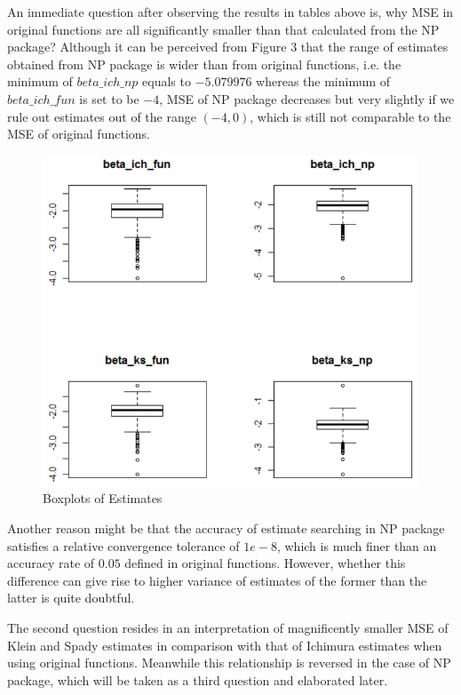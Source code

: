\documentclass[a4paper]{article}
\begin{document}
An immediate question after observing the results in tables above is, why MSE in original functions are all significantly smaller than that calculated from the NP package?
Although it can be perceived from Figure 3 that the range of estimates obtained from NP package is wider than from original functions, i.e. the minimum of $beta\_ich\_np$ equals to $-5.079976$ whereas the minimum of $beta\_ich\_fun$ is set to be $-4$, MSE of NP package decreases but very slightly if we rule out estimates out of the range $(-4,0)$, which is still not comparable to the MSE of original functions. 

\begin{figure}[h!]
  \caption{Boxplots of Estimates}
  \includegraphics[width=\linewidth]{boxplot_beta.png}
 
  \label{fig:boxplots of estimates}
\end{figure}

Another reason might be that the accuracy of estimate searching in NP package satisfies a relative convergence tolerance of $1e-8$, which is much finer than an accuracy rate of $0.05$ defined in original functions. However, whether this difference can give rise to higher variance of estimates of the former than the latter is quite doubtful.

The second question resides in an interpretation of magnificently smaller MSE of Klein and Spady estimates in comparison with that of Ichimura estimates when using original functions. Meanwhile this relationship is reversed in the case of NP package, which will be taken as a third question and elaborated later.
\end{document}
